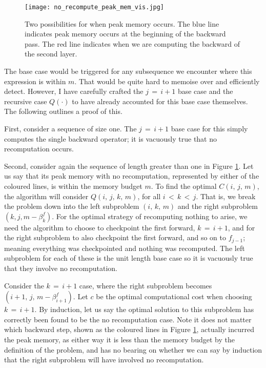 \begin{figure}[h]
    \centering
    \texttt{[image: no\_recompute\_peak\_mem\_vis.jpg]}
    \caption{Two possibilities for when peak memory occurs. The blue line indicates peak memory occurs at the beginning of the backward pass. The red line indicates when we are computing the backward of the second layer.}
    \label{fig:3-base-case-peak-mem}
\end{figure}

The base case would be triggered for any subsequence we encounter where this expression is within \(m\).
That would be quite hard to memoise over and efficiently detect.
However, I have carefully crafted the \(j\,=\,i+1\) base case and the recursive case \(Q(\cdot)\) to have already accounted for this base case themselves.
The following outlines a proof of this.

First, consider a sequence of size one.
The \(j\,=\,i+1\) base case for this simply computes the single backward operator; it is vacuously true that no recomputation occurs.

Second, consider again the sequence of length greater than one in Figure \ref{fig:3-base-case-peak-mem}.
Let us say that its peak memory with no recomputation, represented by either of the coloured lines, is within the memory budget \(m\).
To find the optimal \(C(i,\,j,\,m)\), the algorithm will consider \(Q(i,\,j,\,k,\,m)\), for all \(i \,<\, k \,<\, j\).
That is, we break the problem down into the left subproblem \((i,\,k,\,m)\) and the right subproblem \((k,j,m-\beta^f_k)\).
For the optimal strategy of recomputing nothing to arise, we need the algorithm to choose to checkpoint the first forward, \(k\,=\,i+1\), and for the right subproblem to also checkpoint the first forward, and so on to \(f_{j-1}\); meaning everything was checkpointed and nothing was recomputed.
The left subproblem for each of these is the unit length base case so it is vacuously true that they involve no recomputation.

Consider the \(k\,=\,i+1\) case, where the right subproblem becomes \((i+1,\,j,\,m-\beta^f_{i+1})\).
Let \(c\) be the optimal computational cost when choosing \(k\,=\,i+1\).
By induction, let us say the optimal solution to this subproblem has correctly been found to be the no recomputation case.
Note it does not matter which backward step, shown as the coloured lines in Figure \ref{fig:3-base-case-peak-mem}, actually incurred the peak memory,
as either way it is less than the memory budget by the definition of the problem, and has no bearing on whether we can say by induction that the right subproblem will have involved no recomputation.

